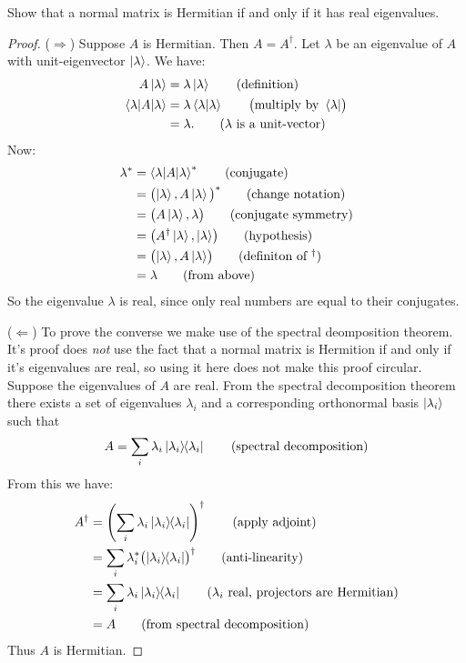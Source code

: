  Show that a normal matrix is Hermitian if and only if it has real eigenvalues.
\begin{proof}
	($\Rightarrow$) Suppose $A$ is Hermitian. Then $A=A^\dagger$.
	Let $\lambda$ be an eigenvalue of $A$ with unit-eigenvector $\ket{\lambda}$.  We have:
	\begin{align*}
		A \ket{\lambda} &= \lambda \ket{\lambda} \tag{definition} \\
		\braket{\lambda | A | \lambda} &= \lambda \braket{\lambda | \lambda} \tag*{$\bigl(\text{multiply by } \bra{\lambda}\bigr)$}\\
		& = \lambda. \tag{$\lambda$ is a unit-vector}
	\end{align*}
	Now:
	\begin{align*}
		\lambda^*  &= \braket{\lambda | A | \lambda}^* \tag{conjugate}\\
		&= \bigl(\ket{\lambda} , A\ket{\lambda}\bigl)^* \tag{change notation}\\
		&= \bigl(A\ket{\lambda},\lambda\bigr) \tag{conjugate symmetry} \\
		&= \bigl(A^\dagger\ket{\lambda}, \ket{\lambda}\bigr) \tag{hypothesis} \\
		&= \bigl(\ket{\lambda}, A\ket{\lambda}\bigr) \tag{definiton of $^\dagger$} \\
		&= \lambda \tag{from above}
	\end{align*}
	So the eigenvalue $\lambda$ is real, since only real numbers are equal to their conjugates.
	
	\noindent($\Leftarrow$) To prove the converse we make use of the spectral deomposition theorem. It's proof does \textit{not} use the fact that a normal matrix is Hermition if and only if it's eigenvalues are real, so using it here does not make this proof circular.  Suppose the eigenvalues of $A$ are real. From the spectral decomposition theorem there exists a set of eigenvalues $\lambda_i$ and a corresponding orthonormal basis $\ket{\lambda_i}$ such that
	\begin{align}
		A = \sum_i \lambda_i \ket{\lambda_i}\hspace{-1mm} \bra{\lambda_i} \tag{spectral decomposition}
	\end{align}
From this we have:
	\begin{align*}
		A^\dagger &= \left(\sum_i \lambda_i\ket{\lambda_i}\hspace{-1mm} \bra{\lambda_i}\right)^\dagger \tag{apply adjoint}\\
	&= \sum_i\lambda_i^*\bigl(\ket{\lambda_i}\hspace{-1mm} \bra{\lambda_i}\bigr)^\dagger \tag{anti-linearity}\\
	&= \sum_i \lambda_i \ket{\lambda_i}\hspace{-1mm} \bra{\lambda_i} \tag{$\lambda_i$ real, projectors are Hermitian}\\
								&= A \tag{from spectral decomposition}
	\end{align*}
	Thus $A$ is Hermitian.
\end{proof}

